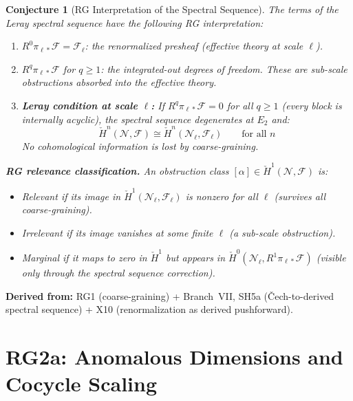 \documentclass[11pt,letterpaper]{article}
\newtheorem{conjecture}{Conjecture}[section]
\newcommand{\Hcech}{\check{H}}
\newcommand{\sheaf}{\mathcal{F}}
\newcommand{\nerve}{\mathcal{N}}
\begin{document}
\begin{conjecture}[RG Interpretation of the Spectral 
Sequence]\label{conj:rg_spectral}
The terms of the Leray spectral sequence have the following RG 
interpretation:

\begin{enumerate}[label=(\alph*)]
    \item $R^0 \pi_{\ell *} \sheaf = \sheaf_\ell$: the 
    \emph{renormalized presheaf} (effective theory at scale $\ell$).
    
    \item $R^q \pi_{\ell *} \sheaf$ for $q \geq 1$: the 
    \emph{integrated-out degrees of freedom}. These are sub-scale 
    obstructions absorbed into the effective theory.
    
    \item \textbf{Leray condition at scale $\ell$:} If 
    $R^q \pi_{\ell *} \sheaf = 0$ for all $q \geq 1$ (every block 
    is internally acyclic), the spectral sequence degenerates at 
    $E_2$ and:
    \begin{equation}\label{eq:leray_degen}
        \Hcech^n(\nerve, \sheaf) \cong 
        \Hcech^n(\nerve_\ell, \sheaf_\ell) \qquad \text{for all } n
    \end{equation}
    No cohomological information is lost by coarse-graining.
\end{enumerate}

\textbf{RG relevance classification.} An obstruction class 
$[\alpha] \in \Hcech^1(\nerve, \sheaf)$ is:
\begin{itemize}
    \item \emph{Relevant} if its image in 
    $\Hcech^1(\nerve_\ell, \sheaf_\ell)$ is nonzero for all $\ell$ 
    (survives all coarse-graining).
    \item \emph{Irrelevant} if its image vanishes at some finite 
    $\ell$ (a sub-scale obstruction).
    \item \emph{Marginal} if it maps to zero in $\Hcech^1$ but 
    appears in $\Hcech^0(\nerve_\ell, R^1 \pi_{\ell *} \sheaf)$ 
    (visible only through the spectral sequence correction).
\end{itemize}
\end{conjecture}

\textbf{Derived from:} RG1 (coarse-graining) + Branch~VII, SH5a 
(\v{C}ech-to-derived spectral sequence) + X10 (renormalization 
as derived pushforward).

\section{RG2a: Anomalous Dimensions and Cocycle Scaling}
\end{document}

